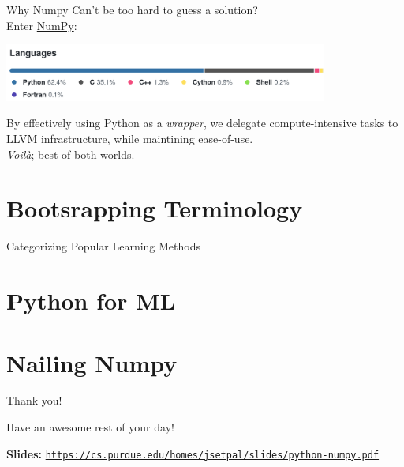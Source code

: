 \documentclass{beamer}
\begin{document}
\begin{frame}{Why Numpy}
	Can't be too hard to guess a solution? \newline \\ \pause 
	Enter \href{https://numpy.org/}{NumPy}:
	\begin{center}
		\includegraphics[width=0.8\textwidth]{images/np-langsplit}
	\end{center} \pause
	By effectively using Python as a \textit{wrapper}, we delegate compute-intensive tasks to LLVM infrastructure, while maintining ease-of-use. \newline \\
	\textit{Voilà}; best of both worlds.
\end{frame}

\section{Bootsrapping Terminology}

\begin{frame}{Categorizing Popular Learning Methods}
\end{frame}

\section{Python for ML}

\section{Nailing Numpy}

\begin{frame}{Thank you!}
	\begin{center}
		Have an awesome rest of your day!
	\end{center}
	\begin{center}
		\textbf{Slides:} \texttt{\url{https://cs.purdue.edu/homes/jsetpal/slides/python-numpy.pdf}}
	\end{center}
\end{frame}
\end{document}
